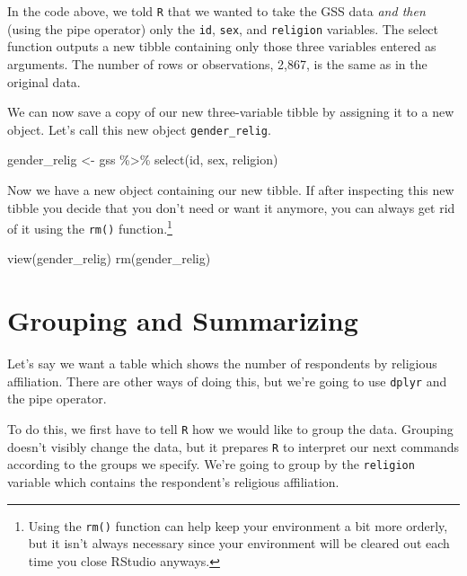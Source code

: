 \documentclass[
  letterpaper,
]{book}
\newenvironment{Shaded}{\begin{snugshade}}{\end{snugshade}}
\newcommand{\FunctionTok}[1]{\textcolor[rgb]{0.28,0.35,0.67}{#1}}
\newcommand{\NormalTok}[1]{\textcolor[rgb]{0.00,0.23,0.31}{#1}}
\newcommand{\OtherTok}[1]{\textcolor[rgb]{0.00,0.23,0.31}{#1}}
\newcommand{\SpecialCharTok}[1]{\textcolor[rgb]{0.37,0.37,0.37}{#1}}
\begin{document}
In the code above, we told \texttt{R} that we wanted to take the GSS
data \emph{and then} (using the pipe operator) only the \texttt{id},
\texttt{sex}, and \texttt{religion} variables. The select function
outputs a new tibble containing only those three variables entered as
arguments. The number of rows or observations, 2,867, is the same as in
the original data.

We can now save a copy of our new three-variable tibble by assigning it
to a new object. Let's call this new object \texttt{gender\_relig}.

\begin{Shaded}
\begin{Highlighting}[]
\NormalTok{gender\_relig }\OtherTok{\textless{}{-}}\NormalTok{ gss }\SpecialCharTok{\%\textgreater{}\%}
  \FunctionTok{select}\NormalTok{(id, sex, religion)}
\end{Highlighting}
\end{Shaded}

Now we have a new object containing our new tibble. If after inspecting
this new tibble you decide that you don't need or want it anymore, you
can always get rid of it using the \texttt{rm()} function.\footnote{Using
  the \texttt{rm()} function can help keep your environment a bit more
  orderly, but it isn't always necessary since your environment will be
  cleared out each time you close RStudio anyways.}

\begin{Shaded}
\begin{Highlighting}[]
\FunctionTok{view}\NormalTok{(gender\_relig)}
\FunctionTok{rm}\NormalTok{(gender\_relig)}
\end{Highlighting}
\end{Shaded}

\hypertarget{grouping-and-summarizing}{%
\section{Grouping and Summarizing}\label{grouping-and-summarizing}}

Let's say we want a table which shows the number of respondents by
religious affiliation. There are other ways of doing this, but we're
going to use \texttt{dplyr} and the pipe operator.

To do this, we first have to tell \texttt{R} how we would like to group
the data. Grouping doesn't visibly change the data, but it prepares
\texttt{R} to interpret our next commands according to the groups we
specify. We're going to group by the \texttt{religion} variable which
contains the respondent's religious affiliation.
\end{document}
